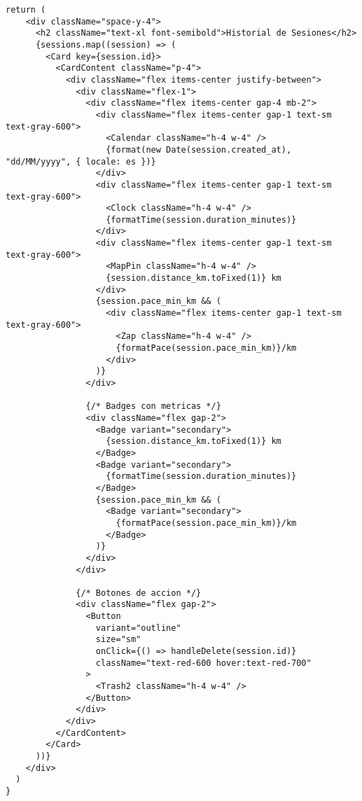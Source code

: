 \documentclass[12pt,a4paper]{article}
\begin{document}
\begin{lstlisting}[caption=components/running/running-list.tsx - Estructura principal]
  return (
    <div className="space-y-4">
      <h2 className="text-xl font-semibold">Historial de Sesiones</h2>
      {sessions.map((session) => (
        <Card key={session.id}>
          <CardContent className="p-4">
            <div className="flex items-center justify-between">
              <div className="flex-1">
                <div className="flex items-center gap-4 mb-2">
                  <div className="flex items-center gap-1 text-sm text-gray-600">
                    <Calendar className="h-4 w-4" />
                    {format(new Date(session.created_at), "dd/MM/yyyy", { locale: es })}
                  </div>
                  <div className="flex items-center gap-1 text-sm text-gray-600">
                    <Clock className="h-4 w-4" />
                    {formatTime(session.duration_minutes)}
                  </div>
                  <div className="flex items-center gap-1 text-sm text-gray-600">
                    <MapPin className="h-4 w-4" />
                    {session.distance_km.toFixed(1)} km
                  </div>
                  {session.pace_min_km && (
                    <div className="flex items-center gap-1 text-sm text-gray-600">
                      <Zap className="h-4 w-4" />
                      {formatPace(session.pace_min_km)}/km
                    </div>
                  )}
                </div>
                
                {/* Badges con metricas */}
                <div className="flex gap-2">
                  <Badge variant="secondary">
                    {session.distance_km.toFixed(1)} km
                  </Badge>
                  <Badge variant="secondary">
                    {formatTime(session.duration_minutes)}
                  </Badge>
                  {session.pace_min_km && (
                    <Badge variant="secondary">
                      {formatPace(session.pace_min_km)}/km
                    </Badge>
                  )}
                </div>
              </div>

              {/* Botones de accion */}
              <div className="flex gap-2">
                <Button
                  variant="outline"
                  size="sm"
                  onClick={() => handleDelete(session.id)}
                  className="text-red-600 hover:text-red-700"
                >
                  <Trash2 className="h-4 w-4" />
                </Button>
              </div>
            </div>
          </CardContent>
        </Card>
      ))}
    </div>
  )
}
\end{lstlisting}
\end{document}
